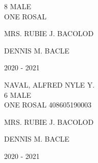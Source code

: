 \documentclass{article}
\begin{document}
{{\begin{multicols}{2}
\phantom{Age} \hspace*{8em} 8  \phantom{Sex} \hspace*{12em} MALE \\[2.5mm] %
\phantom{Grade} \hspace*{3em} ONE \phantom{Section} \hspace*{4em} ROSAL \phantom{LRN} \hspace*{4em} \phantom{ } \\
\vspace*{25mm}
\begin{flushright}
MRS. RUBIE J. BACOLOD \hspace*{-1.5em}
\end{flushright}  
\vspace*{1.5mm}
\hspace*{3em} DENNIS M. BACLE
\end{multicols} 
\newpage
\begin{multicols}{2}
\phantom{u}
\columnbreak
\vspace*{-3mm}
\begin{center}
\phantom{school year:} \hspace*{6em} 2020 - 2021 
\end{center} 
\vspace{4mm} 
\phantom{Name:} \hspace*{5em} NAVAL, ALFRED NYLE Y. \\[2.5mm] %
\phantom{Age} \hspace*{8em} 6  \phantom{Sex} \hspace*{12em} MALE \\[2.5mm] %
\phantom{Grade} \hspace*{3em} ONE \phantom{Section} \hspace*{4em} ROSAL \phantom{LRN} \hspace*{4em} 408605190003 \\
\vspace*{25mm}
\begin{flushright}
MRS. RUBIE J. BACOLOD \hspace*{-1.5em}
\end{flushright}  
\vspace*{1.5mm}
\hspace*{3em} DENNIS M. BACLE
\end{multicols} 
\newpage
\begin{multicols}{2}
\phantom{u}
\columnbreak
\vspace*{-3mm}
\begin{center}
\phantom{school year:} \hspace*{6em} 2020 - 2021 

\end{center}
\end{multicols}}}
\end{document}
